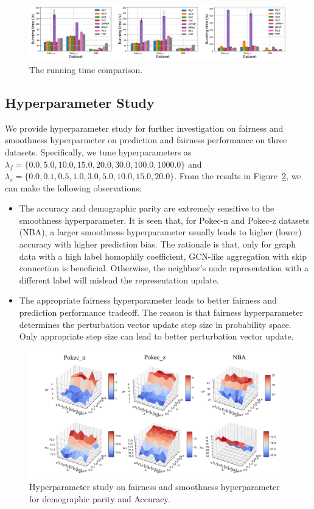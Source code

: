 \documentclass[letterpaper]{article} %
\theoremstyle{plain}
\theoremstyle{definition}
\theoremstyle{remark}
\begin{document}
\begin{figure}[t]
\centering
\includegraphics[width=0.99\linewidth]{runtime_all.pdf}

\caption{The running time comparison.}
\label{fig:runtime}
\end{figure}

\subsection{Hyperparameter Study} \label{app:hyper}
We provide hyperparameter study for further investigation on fairness and smoothness hyperparmeter on prediction and fairness performance on three datasets. Specifically, we tune hyperparameters as $\lambda_f=\{0.0, 5.0, 10.0, 15.0, 20.0, 30.0, 100.0, 1000.0\}$ and $\lambda_s=\{0.0, 0.1, 0.5, 1.0, 3.0, 5.0, 10.0, 15.0, 20.0\}$. From the results in Figure~\ref{fig:hyper}, we can make the following observations:
\begin{itemize}
    \item The accuracy and demographic parity are extremely sensitive to the smoothness hyperparameter. It is seen that, for Pokec-n and Pokec-z datasets (NBA), a larger smoothness hyperparameter usually leads to higher (lower) accuracy with higher prediction bias. The rationale is that, only for graph data with a high label homophily coefficient, GCN-like aggregation with skip connection is beneficial. Otherwise, the neighbor's node representation with a different label will mislead the representation update.
    \item The appropriate fairness hyperparameter leads to better fairness and prediction performance tradeoff. The reason is that fairness hyperparameter determines the perturbation vector update step size in probability space. Only appropriate step size can lead to better perturbation vector update.
\end{itemize}

\begin{figure}[t]
\centering
\includegraphics[width=0.9\linewidth]{Hyper_all.pdf}

\caption{Hyperparameter study on fairness and smoothness hyperparameter for demographic parity and Accuracy.}
\label{fig:hyper}
\end{figure}
\end{document}
